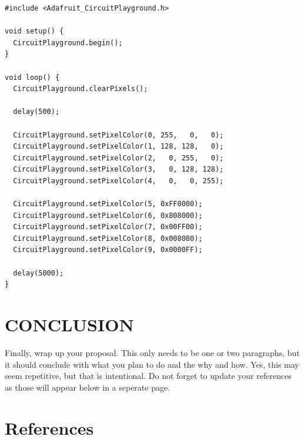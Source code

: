 \documentclass[12pt]{article}
\begin{document}
\begin{lstlisting}[language=Arduino]
#include <Adafruit_CircuitPlayground.h>

void setup() {
  CircuitPlayground.begin();
}

void loop() {
  CircuitPlayground.clearPixels();

  delay(500);

  CircuitPlayground.setPixelColor(0, 255,   0,   0);
  CircuitPlayground.setPixelColor(1, 128, 128,   0);
  CircuitPlayground.setPixelColor(2,   0, 255,   0);
  CircuitPlayground.setPixelColor(3,   0, 128, 128);
  CircuitPlayground.setPixelColor(4,   0,   0, 255);
  
  CircuitPlayground.setPixelColor(5, 0xFF0000);
  CircuitPlayground.setPixelColor(6, 0x808000);
  CircuitPlayground.setPixelColor(7, 0x00FF00);
  CircuitPlayground.setPixelColor(8, 0x008080);
  CircuitPlayground.setPixelColor(9, 0x0000FF);
 
  delay(5000);
}
\end{lstlisting}

\section{CONCLUSION}
Finally, wrap up your proposal. This only needs to be one or two paragraphs, but it should conclude with what you plan to do and the why and how. Yes, this may seem repetitive, but that is intentional. Do not forget to update your references as those will appear below in a seperate page.

\newpage
\section{References}
\printbibliography[heading=subbibintoc]


\end{document}
